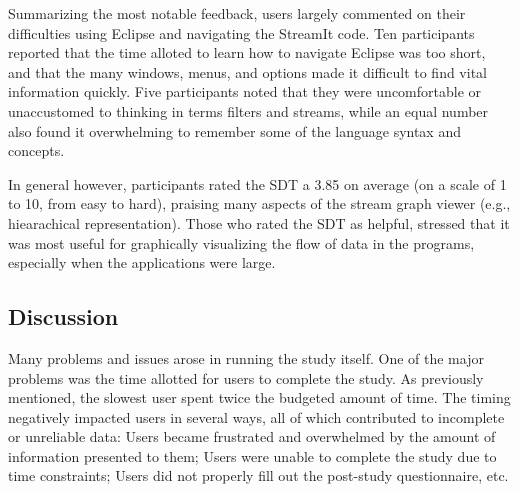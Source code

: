 \documentclass[11pt, letterpaper, onecolumn]{article}
\begin{document}
Summarizing  the most  notable  feedback, users  largely commented  on
their difficulties using Eclipse and navigating the StreamIt code. Ten
participants reported that  the time alloted to learn  how to navigate
Eclipse was too  short, and that the many  windows, menus, and options
made   it  difficult   to  find   vital  information   quickly.   Five
participants  noted that  they were  uncomfortable or  unaccustomed to
thinking  in terms  filters and  streams, while  an equal  number also
found  it overwhelming  to remember  some of  the language  syntax and
concepts.

In general however, participants rated the SDT a 3.85 on average (on a
scale of  1 to 10,  from easy to  hard), praising many aspects  of the
stream  graph viewer (e.g.,  hiearachical representation).   Those who
rated  the  SDT as  helpful,  stressed that  it  was  most useful  for
graphically visualizing  the flow of data in  the programs, especially
when the applications were large.


\subsection{Discussion}

Many problems and issues arose in running the study itself. One of the
major  problems  was the  time  allotted  for  users to  complete  the
study.  As previously  mentioned,  the slowest  user  spent twice  the
budgeted  amount of  time.  The  timing negatively  impacted  users in
several  ways, all of  which contributed  to incomplete  or unreliable
data:  Users  became  frustrated  and  overwhelmed by  the  amount  of
information presented to them; Users were unable to complete the study
due  to  time  constraints;  Users  did  not  properly  fill  out  the
post-study questionnaire, etc.
\end{document}
